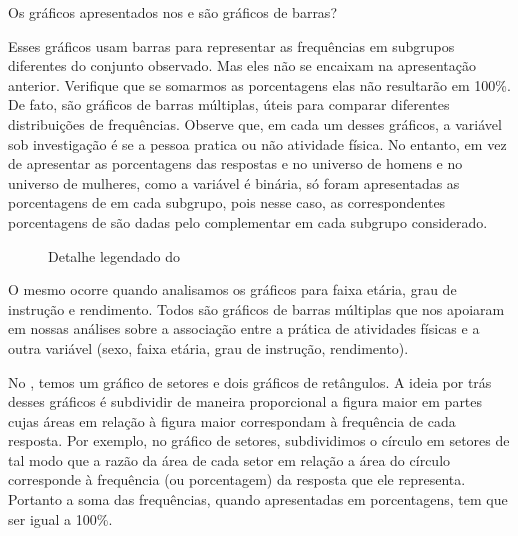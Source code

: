 Os gráficos apresentados nos {\hyperref[\detokenize{PE103-0:fig-infografico-pnad-1}]{}} e {\hyperref[\detokenize{PE103-0:fig-infografico-pnad-2}]{}} são gráficos de barras?

Esses gráficos usam barras para representar as frequências em subgrupos diferentes do conjunto observado. Mas eles não se encaixam na apresentação anterior. Verifique que se somarmos as porcentagens elas não resultarão em 100\%. De fato, são gráficos de barras múltiplas, úteis para comparar diferentes distribuições de frequências. Observe que, em cada um desses gráficos, a variável sob investigação é se a pessoa pratica ou não atividade física. No entanto, em vez de apresentar as porcentagens das respostas  e  no universo de homens e no universo de mulheres, como a variável é binária, só foram apresentadas as porcentagens de  em cada subgrupo, pois nesse caso, as correspondentes porcentagens de  são dadas pelo complementar em cada subgrupo considerado.

\begin{figure}[H]
\centering
\capstart

\noindent{}
\caption{Detalhe legendado do }\label{\detokenize{PE103-1:fig-infografico-1-detalhe}}\label{\detokenize{PE103-1:id2}}\end{figure}

O mesmo ocorre quando analisamos os gráficos para faixa etária, grau de instrução e rendimento. Todos são gráficos de barras múltiplas que nos apoiaram em nossas análises sobre a associação entre a prática de atividades físicas e a outra variável (sexo, faixa etária, grau de instrução, rendimento).

No {\hyperref[\detokenize{PE103-0:fig-infografico-pnad-4}]{}}, temos um gráfico de setores e dois gráficos de retângulos. A ideia por trás desses gráficos é subdividir de maneira proporcional a figura maior em partes cujas áreas em relação à figura maior correspondam à frequência de cada resposta. Por exemplo, no gráfico de setores, subdividimos o círculo em setores de tal modo que a razão da área de cada setor em relação a área do círculo corresponde à frequência (ou porcentagem) da resposta que ele representa. Portanto a soma das frequências, quando apresentadas em porcentagens, tem que ser igual a 100$\%$.

